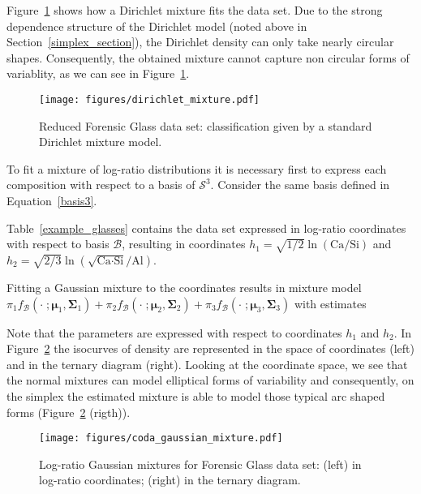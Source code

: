 \documentclass[12pt, a4paper]{article}
\newcommand{\m}[1]{\boldsymbol{#1}}
\theoremstyle{definition}
\begin{document}
Figure~\ref{fig06fittingdirichlet} shows how a Dirichlet mixture fits the data set. Due to the strong dependence structure of the Dirichlet model (noted above in Section~\ref{simplex_section}), the Dirichlet density can only take nearly circular shapes. Consequently, the obtained mixture cannot capture non circular forms of variablity, as we can see in Figure~\ref{fig06fittingdirichlet}.

\begin{figure}[htbp]
\centering
\texttt{[image: figures/dirichlet\_mixture.pdf]}
\caption{Reduced Forensic Glass data set: classification given by a standard Dirichlet mixture model.}
\label{fig06fittingdirichlet}
\end{figure}

To fit a mixture of log-ratio distributions it is necessary first to express each composition with respect to a basis of $\mathcal{S}^3$. Consider the same basis defined in Equation~\ref{basis3}.

Table~\ref{example_glasses} contains the data set expressed in log-ratio coordinates with respect to basis $\mathcal{B}$, resulting in coordinates $h_1 = \sqrt{1/2} \ln(\text{Ca}/\text{Si})$ and $h_2 = \sqrt{2/3} \ln(\sqrt{\text{Ca} \cdot \text{Si}} / \text{Al})$.



Fitting a Gaussian mixture to the coordinates results in mixture model
$
\pi_1 f_{\mathcal{B}}(\cdot\;; \m\mu_1, \m\Sigma_1) + \pi_2 f_{\mathcal{B}}(\cdot\;; \m\mu_2, \m\Sigma_2) + \pi_3 f_{\mathcal{B}}(\cdot\;; \m\mu_3, \m\Sigma_3)
$
with estimates

{\small  }

Note that the parameters are expressed with respect to coordinates $h_1$ and $h_2$. In Figure~\ref{fig07fittingcodaGaussian} the isocurves of density are represented in the space
of coordinates (left) and in the ternary diagram (right). Looking at the coordinate space, we see that the normal mixtures can model elliptical forms of variability and consequently, on the simplex the estimated mixture is able to model those typical arc shaped forms (Figure~\ref{fig07fittingcodaGaussian} (rigth)).

\begin{figure}[htbp]
\centering
\texttt{[image: figures/coda\_gaussian\_mixture.pdf]}\\
\caption{Log-ratio Gaussian mixtures for Forensic Glass data set: (left) in log-ratio coordinates; (right) in the ternary diagram.}
\label{fig07fittingcodaGaussian}
\end{figure}
\end{document}
